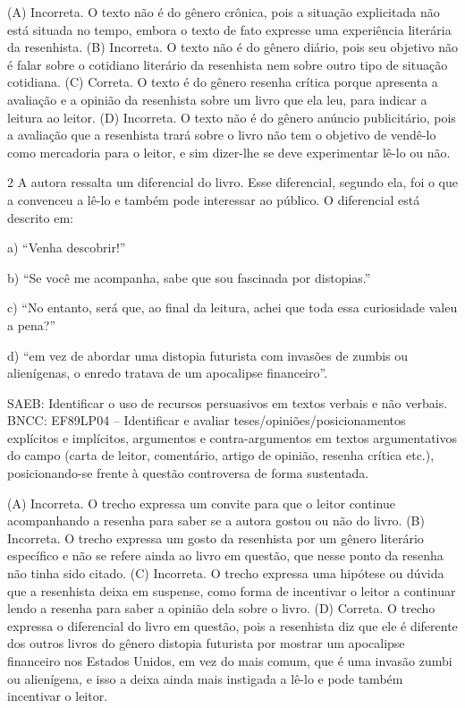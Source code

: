 (A) Incorreta. O texto não é do gênero crônica, pois a situação
explicitada não está situada no tempo, embora o texto de fato expresse
uma experiência literária da resenhista. (B) Incorreta. O texto não é do
gênero diário, pois seu objetivo não é falar sobre o cotidiano literário
da resenhista nem sobre outro tipo de situação cotidiana. (C) Correta. O
texto é do gênero resenha crítica porque apresenta a avaliação e a
opinião da resenhista sobre um livro que ela leu, para indicar a leitura
ao leitor. (D) Incorreta. O texto não é do gênero anúncio publicitário,
pois a avaliação que a resenhista trará sobre o livro não tem o objetivo
de vendê-lo como mercadoria para o leitor, e sim dizer-lhe se deve
experimentar lê-lo ou não.

\num{2} A autora ressalta um diferencial do livro. Esse diferencial,
segundo ela, foi o que a convenceu a lê-lo e também pode interessar ao
público. O diferencial está descrito em:

a) ``Venha descobrir!''

b) ``Se você me acompanha, sabe que sou fascinada por distopias.''

c) ``No entanto, será que, ao final da leitura, achei que toda essa
curiosidade valeu a pena?''

d) ``em vez de abordar uma distopia futurista com invasões de zumbis ou
alienígenas, o enredo tratava de um apocalipse financeiro''.

SAEB: Identificar o uso de recursos persuasivos em textos verbais e não
verbais. BNCC: EF89LP04 -- Identificar e avaliar
teses/opiniões/posicionamentos explícitos e implícitos, argumentos e
contra-argumentos em textos argumentativos do campo (carta de leitor,
comentário, artigo de opinião, resenha crítica etc.), posicionando-se
frente à questão controversa de forma sustentada.

(A) Incorreta. O trecho expressa um convite para que o leitor continue
acompanhando a resenha para saber se a autora gostou ou não do livro.
(B) Incorreta. O trecho expressa um gosto da resenhista por um gênero
literário específico e não se refere ainda ao livro em questão, que
nesse ponto da resenha não tinha sido citado. (C) Incorreta. O trecho
expressa uma hipótese ou dúvida que a resenhista deixa em suspense, como
forma de incentivar o leitor a continuar lendo a resenha para saber a
opinião dela sobre o livro. (D) Correta. O trecho expressa o diferencial
do livro em questão, pois a resenhista diz que ele é diferente dos
outros livros do gênero distopia futurista por mostrar um apocalipse
financeiro nos Estados Unidos, em vez do mais comum, que é uma invasão
zumbi ou alienígena, e isso a deixa ainda mais instigada a lê-lo e pode
também incentivar o leitor.

